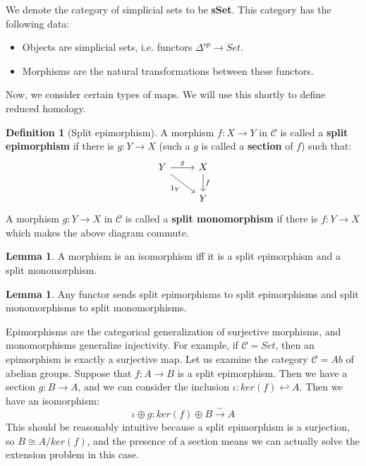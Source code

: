 \documentclass[11pt, oneside]{amsart}   	%
\theoremstyle{definition}
\newtheorem{definition}{Definition}[section]
\newtheorem{lemma}[theorem]{Lemma}
\begin{document}
We denote the category of simplicial sets to be \textbf{sSet}. This category has the following data:
\begin{itemize}
	\item Objects are simplicial sets, i.e. functors $\Delta^{op}\rightarrow Set$. 
	\item Morphisms are the natural transformations between these functors.
\end{itemize}

Now, we consider certain types of maps. We will use this shortly to define reduced homology.

\begin{definition}[Split epimorphism]
	A morphism $f : X\rightarrow Y$ in $\mathcal C$ is called a \textbf{split epimorphism} if there is $g : Y\rightarrow X$ 
	(such a $g$ is called a \textbf{section} of $f$) such that:
	\begin{equation}\begin{tikzcd}
		Y\arrow[r, "g"]\arrow[dr, swap, "1_Y"] & X\arrow[d, "f"] \\ 
		& Y
	\end{tikzcd}\end{equation}
	A morphism $g : Y\rightarrow X$ in $\mathcal C$ is called a \textbf{split monomorphism} if there is $f : Y\rightarrow X$ 
	which makes the above diagram commute.
\end{definition}

\begin{lemma}
	A morphism is an isomorphism iff it is a split epimorphism and a split monomorphism.
\end{lemma}

\begin{lemma}
	Any functor sends split epimorphisms to split epimorphisms and split monomorphisms to split monomorphisms.
\end{lemma}
Epimorphisms are the categorical generalization of surjective morphisms, and monomorphisms generalize injectivity. For 
example, if $\mathcal C = Set$, then an epimorphism is exactly a surjective map. Let us examine the category $\mathcal 
C = Ab$ of abelian groups. Suppose that $f : A\rightarrow B$ is a split epimorphism. Then we have a section $g : B\rightarrow 
A$, and we can consider the inclusion $\iota : ker(f)\hookleftarrow A$. Then we have an isomorphism:
\begin{equation}
	\iota\oplus g : ker(f)\oplus B\xrightarrow{\sim} A
\end{equation}
This should be reasonably intuitive because a split epimorphism is a surjection, so $B\cong A / ker(f)$, and  
the presence of a section means we can actually solve the extension problem in this case. 
\end{document}
